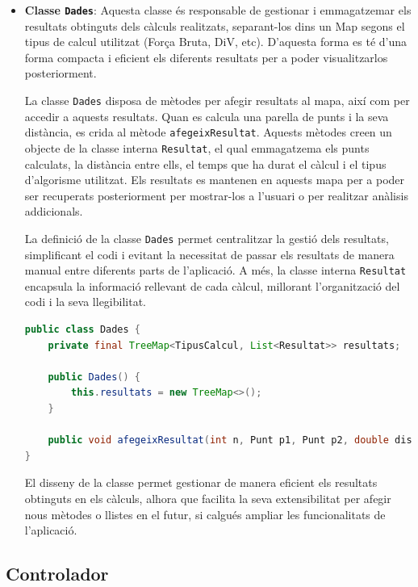 \documentclass{ieeetj}
\begin{document}
\begin{itemize} \item \textbf{Classe \texttt{Dades}}: Aquesta classe és responsable de gestionar i emmagatzemar els resultats obtinguts dels càlculs realitzats, separant-los dins un Map segons el tipus de calcul utilitzat (Força Bruta, DiV, etc). D'aquesta forma es té d'una forma compacta i eficient els diferents resultats per a poder visualitzarlos posteriorment.

La classe \texttt{Dades} disposa de mètodes per afegir resultats al mapa, així com per accedir a aquests resultats. Quan es calcula una parella de punts i la seva distància, es crida al mètode \texttt{afegeixResultat}. Aquests mètodes creen un objecte de la classe interna \texttt{Resultat}, el qual emmagatzema els punts calculats, la distància entre ells, el temps que ha durat el càlcul i el tipus d'algorisme utilitzat. Els resultats es mantenen en aquests mapa per a poder ser recuperats posteriorment per mostrar-los a l'usuari o per realitzar anàlisis addicionals.

La definició de la classe \texttt{Dades} permet centralitzar la gestió dels resultats, simplificant el codi i evitant la necessitat de passar els resultats de manera manual entre diferents parts de l'aplicació. A més, la classe interna \texttt{Resultat} encapsula la informació rellevant de cada càlcul, millorant l'organització del codi i la seva llegibilitat.


\begin{lstlisting}[language=java]
public class Dades {
    private final TreeMap<TipusCalcul, List<Resultat>> resultats;

    public Dades() {
        this.resultats = new TreeMap<>();
    }

    public void afegeixResultat(int n, Punt p1, Punt p2, double distancia, long tempsNano, TipusCalcul calcul)
}
\end{lstlisting}

El disseny de la classe permet gestionar de manera eficient els resultats obtinguts en els càlculs, alhora que facilita la seva extensibilitat per afegir nous mètodes o llistes en el futur, si calgués ampliar les funcionalitats de l'aplicació.

\end{itemize}

\subsection{Controlador}
\end{document}
